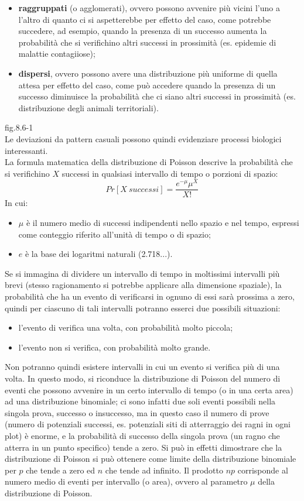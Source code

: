 \documentclass[drafts, 10pt]{book}
\begin{document}
\begin{itemize}
    \item \textbf{raggruppati} (o agglomerati), ovvero possono avvenire più vicini l'uno a l'altro di quanto ci si aspetterebbe per effetto del caso, come potrebbe succedere, ad esempio, quando la presenza di un successo aumenta la probabilità che si verifichino altri successi in prossimità (es. epidemie di malattie contagiiose);
    \item \textbf{dispersi}, ovvero possono avere una distribuzione più uniforme di quella attesa per effetto del caso, come può accedere quando la presenza di un successo diminuisce la probabilità che ci siano altri successi in prossimità (es. distribuzione degli animali territoriali).
\end{itemize}
fig.8.6-1\label{fig8.6-1} %
\\
Le deviazioni da pattern casuali possono quindi evidenziare processi biologici interessanti.
\\
La formula matematica della distribuzione di Poisson descrive la probabilità che si verifichino $X$ successi in qualsiasi intervallo di tempo o porzioni di spazio:
\begin{equation}
Pr[X\ successi] = \frac{e^{-\mu}\mu^X}{X!}
\end{equation}
In cui:
\begin{itemize}
    \item \textbf{$\mu$} è il numero medio di successi indipendenti nello spazio e nel tempo, espressi come conteggio riferito all'unità di tempo o di spazio;
    \item \textbf{$e$} è la base dei logaritmi naturali (2.718...).
\end{itemize}
Se si immagina di dividere un intervallo di tempo in moltissimi intervalli più brevi (stesso ragionamento si potrebbe applicare alla dimensione spaziale), la probabilità che ha un evento di verificarsi in ognuno di essi sarà prossima a zero, quindi per ciascuno di tali intervalli potranno esserci due possibili situazioni:
\begin{itemize}
    \item l'evento di verifica una volta, con probabilità molto piccola;
    \item l'evento non si verifica, con probabilità molto grande.
\end{itemize}
Non potranno quindi esistere intervalli in cui un evento si verifica più di una volta. In questo modo, si riconduce la distribuzione di Poisson del numero di eventi che possono avvenire in un certo intervallo di tempo (o in una certa area) ad una distribuzione binomiale; ci sono infatti due soli eventi possibili nella singola prova, successo o insuccesso, ma in questo caso il numero di prove (numero di potenziali successi, es. potenziali siti di atterraggio dei ragni in ogni plot) è enorme, e la probabilità di successo della singola prova (un ragno che atterra in un punto specifico) tende a zero. Si può in effetti dimostrare che la distribuzione di Poisson si può ottenere come limite della distribuzione binomiale per $p$ che tende a zero ed $n$ che tende ad infinito. Il prodotto $np$ corrisponde al numero medio di eventi per intervallo (o area), ovvero al parametro $\mu$ della distribuzione di Poisson.
\end{document}
